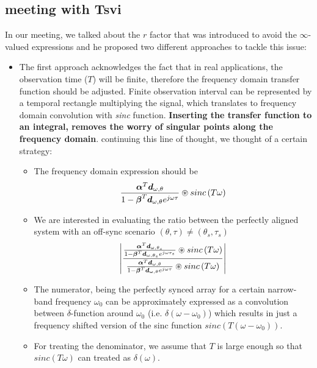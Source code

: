\documentclass[12pt]{article}
\begin{document}
\subsection{meeting with Tsvi}
In our meeting, we talked about the $r$ factor that was introduced to avoid the $\infty$-valued expressions and he proposed two different approaches to tackle this issue:
\begin{itemize}
    \item The first approach acknowledges the fact that in real applications, the observation time ($T$) will be finite, therefore the frequency domain transfer function should be adjusted. Finite observation interval can be represented by a temporal rectangle multiplying the signal, which translates to frequency domain convolution with \textit{sinc} function. \textbf{Inserting the transfer function to an integral, removes the worry of singular points along the frequency domain}. continuing this line of thought, we thought of a certain strategy:
    \begin{itemize}
        \item The frequency domain expression should be 
        $$
        \frac{\boldsymbol{\alpha}^{T}\boldsymbol{d}_{\omega,\theta}
        }{
        1-\boldsymbol{\beta}^{T}\boldsymbol{d}_{\omega,\theta}e^{j\omega\tau}
        }\circledast{sinc\left(T\omega\right)}
        $$
        \item We are interested in evaluating the ratio between the perfectly aligned system with an off-sync scenario $(\theta,\tau)\neq(\theta_{s},\tau_{s})$
        $$
        \left|\frac{
        \frac{\boldsymbol{\alpha}^{T}\boldsymbol{d}_{\omega,\theta_{s}}
        }{
        1-\boldsymbol{\beta}^{T}\boldsymbol{d}_{\omega,\theta_{s}}e^{j\omega\tau_{s}}
        }\circledast{sinc\left(T\omega\right)}
        }{
        \frac{\boldsymbol{\alpha}^{T}\boldsymbol{d}_{\omega,\theta}
        }{
        1-\boldsymbol{\beta}^{T}\boldsymbol{d}_{\omega,\theta}e^{j\omega\tau}
        }\circledast{sinc\left(T\omega\right)}
        }\right|
        $$
        \item The numerator, being the perfectly synced array for a certain narrow-band frequency $\omega_{0}$ can be approximately expressed as a convolution between $\delta$-function around $\omega_{0}$ (i.e. $\delta\left(\omega-\omega_{0}\right)$) which results in just a frequency shifted version of the sinc function $sinc\left(T\left(\omega-\omega_{0}\right)\right)$.
        \item For treating the denominator, we assume that $T$ is large enough so that $sinc\left(T\omega\right)$ can treated as $\delta\left(\omega\right)$.

\end{itemize}
\end{itemize}
\end{document}
